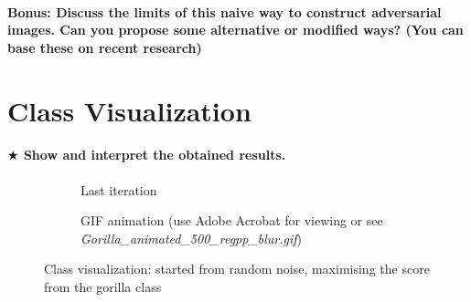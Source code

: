 \paragraph*{\textbf{Bonus:} Discuss the limits of this naive way to construct adversarial images. Can you propose some alternative or modiﬁed ways? (You can base these on recent research)}


\section{Class Visualization}
\paragraph*{$ \bigstar $ Show and interpret the obtained results.}

\begin{figure}
    \centering
    \begin{subfigure}{.5\textwidth}
        \centering
        \caption{Last iteration}
        \label{fig:class_viz_gorilla:png}
    \end{subfigure}%
    \begin{subfigure}{.5\textwidth}
        \centering
        \caption{GIF animation (use Adobe Acrobat for viewing or see \textit{Gorilla\_animated\_500\_regpp\_blur.gif})}
        \label{fig:class_viz_gorilla:gif}
    \end{subfigure}

    \caption{Class visualization: started from random noise, maximising the score from the gorilla class}
    \label{fig:class_viz_gorilla}
\end{figure}



